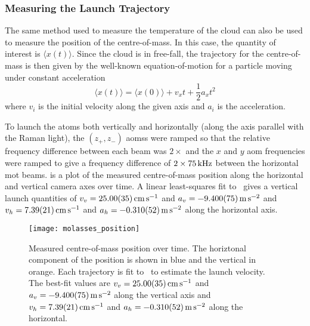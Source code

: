 \subsubsection{Measuring the Launch Trajectory}
The same method used to measure the temperature of the cloud can also be used to measure the position of the centre-of-mass. In this case, the quantity of interest is \(\langle x(t)\rangle\). Since the cloud is in free-fall, the trajectory for the centre-of-mass is then given by the well-known equation-of-motion for a particle moving under constant acceleration
\begin{equation}
    \langle x(t) \rangle = \langle x(0) \rangle + v_x t + \frac{1}{2} a_x t^2
    \label{eq:position_free}
\end{equation}
where \(v_i\) is the initial velocity along the given axis and \(a_i\) is the acceleration.
\par\noindent
To launch the atoms both vertically and horizontally (along the axis parallel with the Raman light), the \((z_+, z_-)\) \acp{aoms} were ramped so that the relative frequency difference between each beam was \(2\times\) and the \(x\) and \(y\) \ac{aom} frequencies were ramped to give a frequency difference of \(2\times \sivalue{75}{\kilo\hertz}\) between the horizontal \ac{mot} beams.  is a plot of the measured centre-of-mass position along the horizontal and vertical camera axes over time. A linear least-squares fit to~ gives a vertical launch quantities of \(v_v = \sivalue{25.0\pm0.35}{\centi\meter\per\second}\) and \(a_v = \sivalue{-9.40\pm0.075}{\metre\per\second\squared}\) and \(v_h = \sivalue{7.39\pm0.21}{\centi\meter\per\second}\) and \(a_h = \sivalue{-0.31\pm0.052}{\metre\per\second\squared}\) along the horizontal axis. 
\begin{figure}
    \centering
    \texttt{[image: molasses\_position]}
    \caption[Atom cloud centre-of-mass over time]{Measured centre-of-mass position over time. The horiztonal component of the position is shown in blue and the vertical in orange. Each trajectory is fit to~ to estimate the launch velocity. The best-fit values are \(v_v = \sivalue{25.0\pm0.35}{\centi\meter\per\second}\) and \(a_v = \sivalue{-9.40\pm0.075}{\metre\per\second\squared}\) along the vertical axis and \(v_h = \sivalue{7.39\pm0.21}{\centi\meter\per\second}\) and \(a_h = \sivalue{-0.31\pm0.052}{\metre\per\second\squared}\) along the horizontal.}
    \label{fig:molasses_position}
\end{figure}
